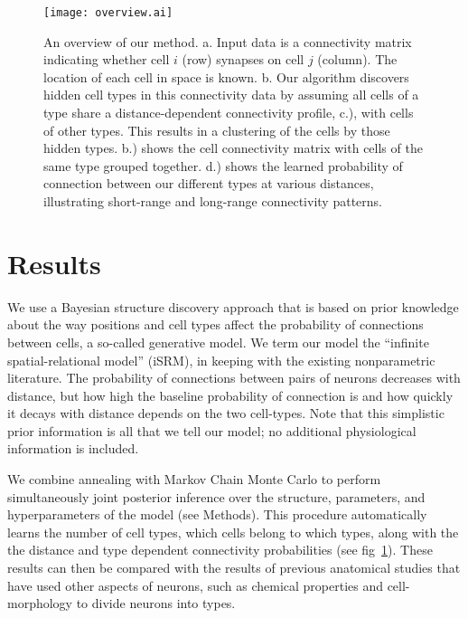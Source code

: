 \documentclass{article}
\begin{document}
\begin{figure}
  \centering 
  \centerline{\texttt{[image: overview.ai]}}
  \caption{An overview of our method. a. Input data is
a connectivity matrix indicating whether cell $i$ (row)
synapses on cell $j$ (column). The location of each cell in space is known. 
b. Our algorithm discovers hidden cell types in this connectivity data
by assuming all cells of a type share a distance-dependent connectivity 
profile, c.), with cells of other types. This results in a clustering 
of the cells by those hidden types. b.) shows the cell connectivity
matrix with cells of the same type grouped together. d.) shows
the learned probability of connection between our different types
at various distances, illustrating short-range and long-range
connectivity patterns.}
\label{fig:overview}
\end{figure}

\section{Results}
We use a Bayesian structure discovery approach that is based on
prior knowledge about the way positions and cell types affect the
probability of connections between cells, a so-called generative
model. We term our model the ``infinite spatial-relational model'' (iSRM), 
in keeping with the existing nonparametric literature.  
The probability of connections between pairs of neurons
decreases with distance, but how high the baseline probability of
connection is and how quickly it decays with distance depends on the
two cell-types. Note that this simplistic prior information is all that 
we tell our model; no additional physiological information is included. 


We combine annealing with Markov Chain Monte Carlo to
perform simultaneously joint posterior inference over the structure,
parameters, and hyperparameters of the model (see Methods). This
procedure automatically learns the number of cell types, which cells 
belong to which types, along with the 
the distance and type dependent connectivity probabilities (see
fig~\ref{fig:overview}). These results can then be compared with the
results of previous anatomical studies that have used other aspects of
neurons, such as chemical properties and cell-morphology to divide
neurons into types.
\end{document}
